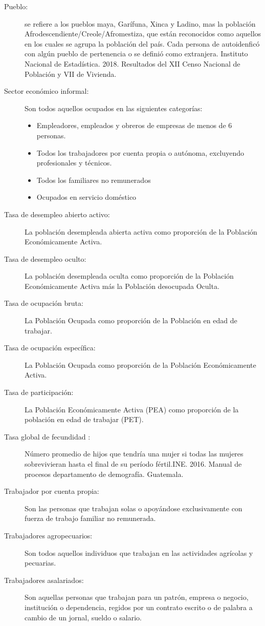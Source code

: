 \begin{description}
 	\item[Pueblo:] se refiere a los pueblos maya, Garífuna, Xinca y Ladino, mas la población Afrodescendiente/Creole/Afromestiza, que están reconocidos como aquellos en los cuales se agrupa la población del país. Cada persona de autoidenficó con algún pueblo de pertenencia o se definió como extranjera. Instituto Nacional de Estadística. 2018. Resultados del XII Censo Nacional de Población y VII de Vivienda.
	\item[Sector económico informal:] Son todos aquellos ocupados en las siguientes categorías:
	\begin{itemize}\itemsep -1pt
		\item	Empleadores, empleados y obreros de empresas de menos de 6 personas.
		\item	Todos los trabajadores por cuenta propia o autónoma, excluyendo profesionales y técnicos. 
		\item	Todos los familiares no remunerados
		\item	Ocupados en servicio doméstico
	\end{itemize}
	\item[Tasa de desempleo abierto activo:] La población desempleada abierta activa como proporción de la Población Económicamente Activa.
	\item[Tasa de desempleo oculto:] La población desempleada oculta como proporción de la Población Económicamente Activa más la Población desocupada Oculta.
	\item[Tasa de ocupación bruta:] La Población Ocupada como proporción de la Población en edad de trabajar.
	\item[Tasa de ocupación específica:] La Población Ocupada como proporción de la Población Económicamente Activa.
	\item[Tasa de participación:] La Población Económicamente Activa (PEA) como proporción de la población en edad de trabajar (PET).
	\item[Tasa global de fecundidad :]Número promedio de hijos que tendría una mujer si todas las mujeres sobrevivieran hasta el final de su período fértil.INE. 2016. Manual de procesos departamento de demografía. Guatemala.
	\item[Trabajador por cuenta propia:] Son las personas que trabajan solas o apoyándose exclusivamente con fuerza de trabajo familiar no remunerada.
	\item[Trabajadores agropecuarios:] Son todos aquellos individuos que trabajan en las actividades agrícolas y pecuarias.
	\item[Trabajadores asalariados:] Son aquellas personas que trabajan para un patrón, empresa o negocio, institución o dependencia, regidos por un contrato escrito o de palabra a cambio de un jornal, sueldo o salario. 

\end{description}
